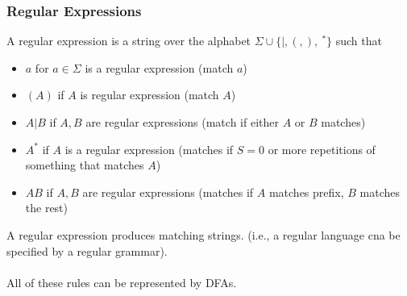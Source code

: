 \documentclass[10pt]{article}
\begin{document}
\subsubsection*{Regular Expressions}
A regular expression is a string over the alphabet $\Sigma \cup \{|, (, ), ~^*\}$ such that
\begin{itemize}
    \item $a$ for $a \in \Sigma$ is a regular expression (match $a$)
    \item $(A)$ if $A$ is regular expression (match $A$)
    \item $A | B$ if $A, B$ are regular expressions (match if either $A$ or $B$ matches)
    \item $A^*$ if $A$ is a regular expression (matches if $S = 0$ or more repetitions of something that matches $A$)
    \item $AB$ if $A, B$ are regular expressions (matches if $A$ matches prefix, $B$ matches the rest)
\end{itemize}
A regular expression produces matching strings.  (i.e., a regular language cna be specified by a regular grammar).\\\\
All of these rules can be represented by DFAs.  
\end{document}
